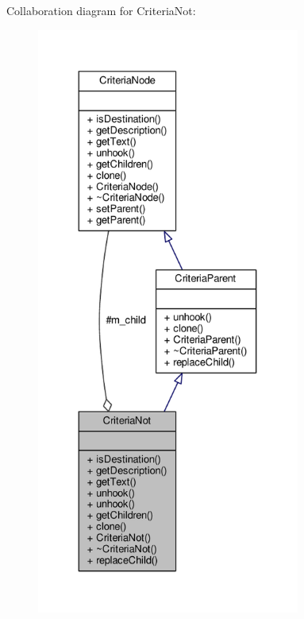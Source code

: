 Collaboration diagram for Criteria\+Not\+:
\nopagebreak
\begin{figure}[H]
\begin{center}
\leavevmode
\includegraphics[height=550pt]{d6/d4e/classCriteriaNot__coll__graph}
\end{center}
\end{figure}
